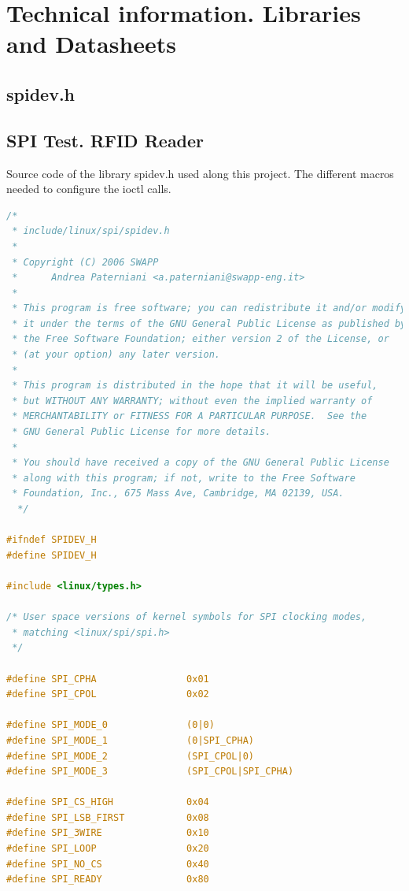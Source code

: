 \chapter{Technical information. Libraries and Datasheets}\label{C:Libraries-Datasheets}
\section{spidev.h}\label{S:linux-spi-spidev}
\section{SPI Test. RFID Reader}\label{S:linux-spi-spidev}
Source code of the library spidev.h used along this project. The different macros needed to configure the ioctl calls.
\begin{lstlisting}[language=C, caption={linux/spi/spidev.h}]
/*
 * include/linux/spi/spidev.h
 *
 * Copyright (C) 2006 SWAPP
 *      Andrea Paterniani <a.paterniani@swapp-eng.it>
 *
 * This program is free software; you can redistribute it and/or modify
 * it under the terms of the GNU General Public License as published by
 * the Free Software Foundation; either version 2 of the License, or
 * (at your option) any later version.
 *
 * This program is distributed in the hope that it will be useful,
 * but WITHOUT ANY WARRANTY; without even the implied warranty of
 * MERCHANTABILITY or FITNESS FOR A PARTICULAR PURPOSE.  See the
 * GNU General Public License for more details.
 *
 * You should have received a copy of the GNU General Public License
 * along with this program; if not, write to the Free Software
 * Foundation, Inc., 675 Mass Ave, Cambridge, MA 02139, USA.
  */

#ifndef SPIDEV_H
#define SPIDEV_H

#include <linux/types.h>

/* User space versions of kernel symbols for SPI clocking modes,
 * matching <linux/spi/spi.h>
 */

#define SPI_CPHA                0x01
#define SPI_CPOL                0x02

#define SPI_MODE_0              (0|0)
#define SPI_MODE_1              (0|SPI_CPHA)
#define SPI_MODE_2              (SPI_CPOL|0)
#define SPI_MODE_3              (SPI_CPOL|SPI_CPHA)

#define SPI_CS_HIGH             0x04
#define SPI_LSB_FIRST           0x08
#define SPI_3WIRE               0x10
#define SPI_LOOP                0x20
#define SPI_NO_CS               0x40
#define SPI_READY               0x80


\end{lstlisting}

